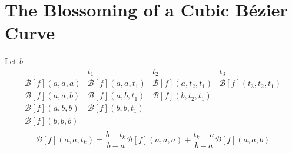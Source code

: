 
\section{The Blossoming of a Cubic Bézier Curve}
Let $b$ 
\[\begin{matrix}
	&t_1&t_2&t_3\\
	\hline
	\mathcal{B}[f](a,a,a)&\mathcal{B}[f](a,a,t_1)&\mathcal{B}[f](a,t_2,t_1)&\mathcal{B}[f](t_3,t_2,t_1)\\
	\mathcal{B}[f](a,a,b)&\mathcal{B}[f](a,b,t_1)&\mathcal{B}[f](b,t_2,t_1)&\\
	\mathcal{B}[f](a,b,b)&\mathcal{B}[f](b,b,t_1)&&\\
	\mathcal{B}[f](b,b,b)&&&\\
\end{matrix}\]
\[\mathcal{B}[f](a,a,t_k) = \frac{b-t_k}{b-a}\mathcal{B}[f](a,a,a)+\frac{t_k-a}{b-a}\mathcal{B}[f](a,a,b)\]
